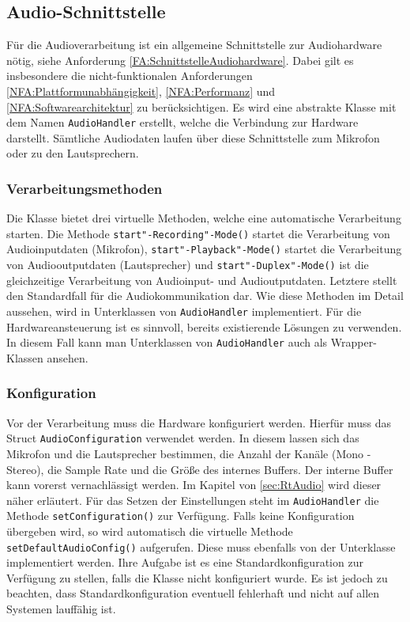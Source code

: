 \subsection{Audio-Schnittstelle}
Für die Audioverarbeitung ist ein allgemeine Schnittstelle zur Audiohardware nötig, siehe Anforderung \ref{FA:SchnittstelleAudiohardware}. Dabei gilt es insbesondere die nicht-funktionalen Anforderungen \ref{NFA:Plattformunabhängigkeit}, \ref{NFA:Performanz} und \ref{NFA:Softwarearchitektur} zu berücksichtigen. Es wird eine abstrakte Klasse mit dem Namen \texttt{AudioHandler} erstellt, welche die Verbindung zur Hardware darstellt. Sämtliche Audiodaten laufen über diese Schnittstelle zum Mikrofon oder zu den Lautsprechern. 

\subsubsection{Verarbeitungsmethoden}
Die Klasse bietet drei virtuelle Methoden, welche eine automatische Verarbeitung starten. Die Methode \texttt{start"-Recording"-Mode()} startet die Verarbeitung von Audioinputdaten (Mikrofon), \texttt{start"-Playback"-Mode()} startet die Verarbeitung von Audiooutputdaten (Lautsprecher) und \texttt{start"-Duplex"-Mode()} ist die gleichzeitige Verarbeitung von Audioinput- und Audioutputdaten. Letztere stellt den Standardfall für die Audiokommunikation dar. Wie diese Methoden im Detail aussehen, wird in Unterklassen von \texttt{AudioHandler} implementiert. Für die Hardwareansteuerung ist es sinnvoll, bereits existierende Lösungen zu verwenden. In diesem Fall kann man Unterklassen von \texttt{AudioHandler} auch als Wrapper-Klassen ansehen.

\subsubsection{Konfiguration}
Vor der Verarbeitung muss die Hardware konfiguriert werden. Hierfür muss das Struct \texttt{AudioConfiguration} verwendet werden. In diesem lassen sich das Mikrofon und die Lautsprecher bestimmen, die Anzahl der Kanäle (Mono - Stereo), die Sample Rate und die Größe des internes Buffers. Der interne Buffer kann vorerst vernachlässigt werden. Im Kapitel von \ref{sec:RtAudio} wird dieser näher erläutert. Für das Setzen der Einstellungen steht im \texttt{AudioHandler} die Methode \texttt{setConfiguration()} zur Verfügung. Falls keine Konfiguration übergeben wird, so wird automatisch die virtuelle Methode \texttt{setDefaultAudioConfig()} aufgerufen. Diese muss ebenfalls von der Unterklasse implementiert werden. Ihre Aufgabe ist es eine Standardkonfiguration zur Verfügung zu stellen, falls die Klasse nicht konfiguriert wurde. Es ist jedoch zu beachten, dass Standardkonfiguration eventuell fehlerhaft und nicht auf allen Systemen lauffähig ist.

